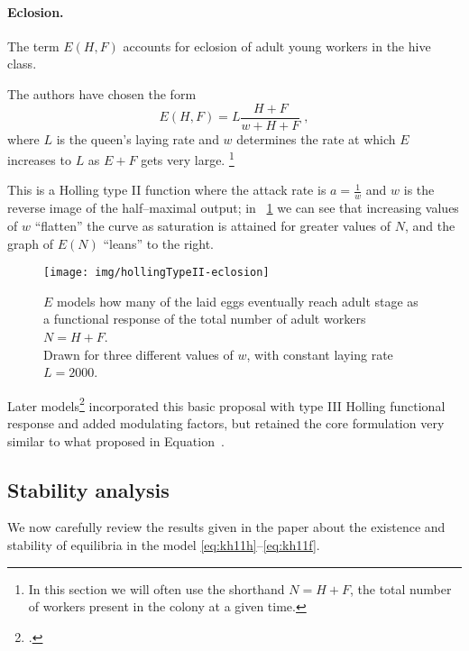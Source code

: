 \paragraph{Eclosion.}
The term $E(H,F)$ accounts for eclosion of adult young workers in the hive class.

The authors have chosen the form
\begin{equation}
    \label{eq:eclos}
    E(H,F) = L \frac{H+F}{w + H + F} \; ,
\end{equation}
where $L$ is the queen's laying rate and $w$ determines the rate at which $E$ increases to $L$ as $E+F$ gets very large.
\footnote{In this section we will often use the shorthand $N=H+F$, the total number of workers present in the colony at a given time.}

This is a Holling type II function where the attack rate is $a=\frac{1}{w}$ and $w$ is the reverse image of the half--maximal output; in \figurename~\ref{img:eclos} we can see that increasing values of $w$ ``flatten'' the curve
as saturation is attained for greater values of $N$, and the graph of $E(N)$ ``leans'' to the right.

\begin{figure}[pbh]
    \centering
    \texttt{[image: img/hollingTypeII-eclosion]}

    \caption[Holling type II Eclosion]{$E$ models how many of the laid eggs eventually reach adult stage as a functional response of the total number of adult workers $N=H+F$.
    \\
    Drawn for three different values of $w$, with constant laying rate $L=2000$.}
    \label{img:eclos}
\end{figure}

Later models\footcite{ratti2017} incorporated this basic proposal with type III Holling functional response and added modulating factors, but retained the core formulation very similar to what     \citeauthor{khoury2011} proposed in Equation~.


\subsection{Stability analysis}
We now carefully review the results given in the paper about the existence and stability of equilibria in the model \eqref{eq:kh11h}--\eqref{eq:kh11f}.

